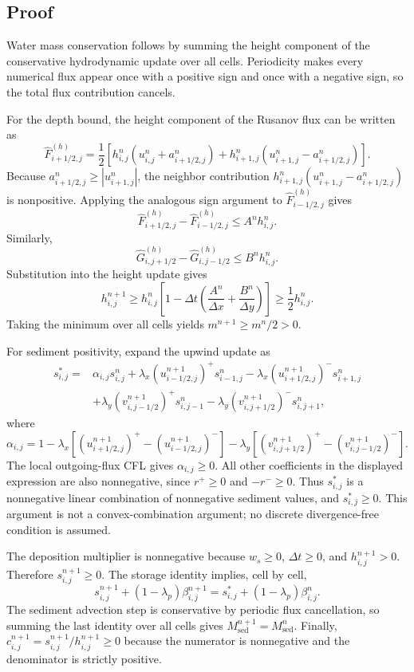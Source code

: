 \subsection{Proof}

Water mass conservation follows by summing the height component of the conservative hydrodynamic update over all cells. Periodicity makes every numerical flux appear once with a positive sign and once with a negative sign, so the total flux contribution cancels.

For the depth bound, the height component of the Rusanov flux can be written as
\[
\widehat F^{(h)}_{i+1/2,j}
=\frac12\left[
h_{i,j}^n(u_{i,j}^n+a_{i+1/2,j}^n)
+h_{i+1,j}^n(u_{i+1,j}^n-a_{i+1/2,j}^n)
\right].
\]
Because \(a_{i+1/2,j}^n\ge |u_{i+1,j}^n|\), the neighbor contribution
\(h_{i+1,j}^n(u_{i+1,j}^n-a_{i+1/2,j}^n)\) is nonpositive. Applying the analogous sign argument to \(\widehat F^{(h)}_{i-1/2,j}\) gives
\[
\widehat F^{(h)}_{i+1/2,j}-\widehat F^{(h)}_{i-1/2,j}
\le A^n h_{i,j}^n.
\]
Similarly,
\[
\widehat G^{(h)}_{i,j+1/2}-\widehat G^{(h)}_{i,j-1/2}
\le B^n h_{i,j}^n .
\]
Substitution into the height update gives
\[
h_{i,j}^{n+1}
\ge h_{i,j}^{n}
\left[1-\Delta t\left(\frac{A^n}{\Delta x}+\frac{B^n}{\Delta y}\right)\right]
\ge \frac12 h_{i,j}^{n}.
\]
Taking the minimum over all cells yields \(m^{n+1}\ge m^n/2>0\).

For sediment positivity, expand the upwind update as
\[
\begin{aligned}
s_{i,j}^{*}
={}&\alpha_{i,j}s_{i,j}^{n}
+\lambda_x\left(u_{i-1/2,j}^{n+1}\right)^+s_{i-1,j}^{n}
-\lambda_x\left(u_{i+1/2,j}^{n+1}\right)^-s_{i+1,j}^{n} \\
&+\lambda_y\left(v_{i,j-1/2}^{n+1}\right)^+s_{i,j-1}^{n}
-\lambda_y\left(v_{i,j+1/2}^{n+1}\right)^-s_{i,j+1}^{n},
\end{aligned}
\]
where
\[
\alpha_{i,j}
=1-\lambda_x\left[
\left(u_{i+1/2,j}^{n+1}\right)^+
-\left(u_{i-1/2,j}^{n+1}\right)^-
\right]
-\lambda_y\left[
\left(v_{i,j+1/2}^{n+1}\right)^+
-\left(v_{i,j-1/2}^{n+1}\right)^-
\right].
\]
The local outgoing-flux CFL gives \(\alpha_{i,j}\ge0\). All other coefficients in the displayed expression are also nonnegative, since \(r^+\ge0\) and \(-r^-\ge0\). Thus \(s_{i,j}^*\) is a nonnegative linear combination of nonnegative sediment values, and \(s_{i,j}^*\ge0\). This argument is not a convex-combination argument; no discrete divergence-free condition is assumed.

The deposition multiplier is nonnegative because \(w_s\ge0\), \(\Delta t\ge0\), and \(h_{i,j}^{n+1}>0\). Therefore \(s_{i,j}^{n+1}\ge0\). The storage identity implies, cell by cell,
\[
s_{i,j}^{n+1}+(1-\lambda_p)\beta_{i,j}^{n+1}
=
s_{i,j}^{*}+(1-\lambda_p)\beta_{i,j}^{n}.
\]
The sediment advection step is conservative by periodic flux cancellation, so summing the last identity over all cells gives \(M_{\mathrm{sed}}^{n+1}=M_{\mathrm{sed}}^n\). Finally, \(c_{i,j}^{n+1}=s_{i,j}^{n+1}/h_{i,j}^{n+1}\ge0\) because the numerator is nonnegative and the denominator is strictly positive.
